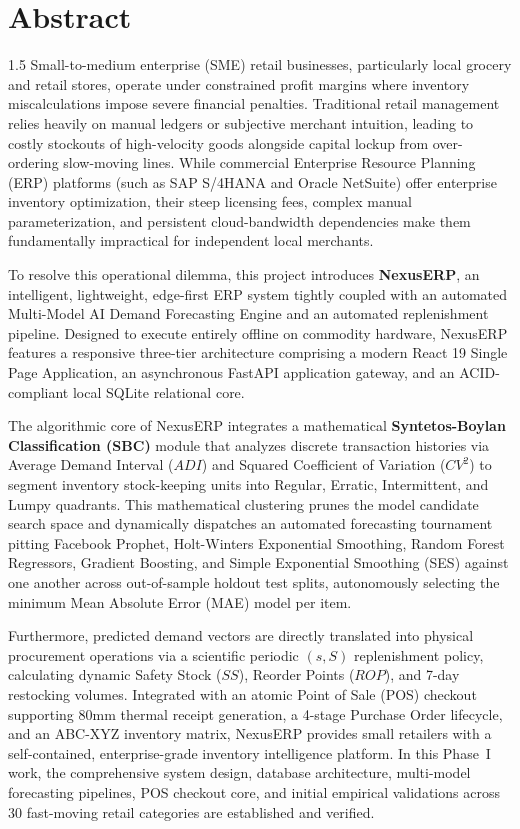 \chapter*{Abstract}
\begin{spacing}{1.5}
Small-to-medium enterprise (SME) retail businesses, particularly local grocery and retail stores, operate under constrained profit margins where inventory miscalculations impose severe financial penalties. Traditional retail management relies heavily on manual ledgers or subjective merchant intuition, leading to costly stockouts of high-velocity goods alongside capital lockup from over-ordering slow-moving lines. While commercial Enterprise Resource Planning (ERP) platforms (such as SAP S/4HANA and Oracle NetSuite) offer enterprise inventory optimization, their steep licensing fees, complex manual parameterization, and persistent cloud-bandwidth dependencies make them fundamentally impractical for independent local merchants.

To resolve this operational dilemma, this project introduces \textbf{NexusERP}, an intelligent, lightweight, edge-first ERP system tightly coupled with an automated Multi-Model AI Demand Forecasting Engine and an automated replenishment pipeline. Designed to execute entirely offline on commodity hardware, NexusERP features a responsive three-tier architecture comprising a modern React 19 Single Page Application, an asynchronous FastAPI application gateway, and an ACID-compliant local SQLite relational core. 

The algorithmic core of NexusERP integrates a mathematical \textbf{Syntetos-Boylan Classification (SBC)} module that analyzes discrete transaction histories via Average Demand Interval ($ADI$) and Squared Coefficient of Variation ($CV^2$) to segment inventory stock-keeping units into Regular, Erratic, Intermittent, and Lumpy quadrants. This mathematical clustering prunes the model candidate search space and dynamically dispatches an automated forecasting tournament pitting Facebook Prophet, Holt-Winters Exponential Smoothing, Random Forest Regressors, Gradient Boosting, and Simple Exponential Smoothing (SES) against one another across out-of-sample holdout test splits, autonomously selecting the minimum Mean Absolute Error (MAE) model per item.

Furthermore, predicted demand vectors are directly translated into physical procurement operations via a scientific periodic $(s, S)$ replenishment policy, calculating dynamic Safety Stock ($SS$), Reorder Points ($ROP$), and 7-day restocking volumes. Integrated with an atomic Point of Sale (POS) checkout supporting 80mm thermal receipt generation, a 4-stage Purchase Order lifecycle, and an ABC-XYZ inventory matrix, NexusERP provides small retailers with a self-contained, enterprise-grade inventory intelligence platform. In this Phase~I work, the comprehensive system design, database architecture, multi-model forecasting pipelines, POS checkout core, and initial empirical validations across 30 fast-moving retail categories are established and verified.
\end{spacing}
